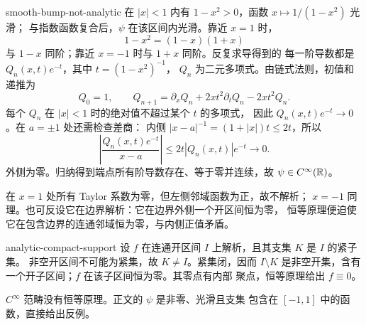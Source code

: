 \begin{solution}{smooth-bump-not-analytic}
在 \(|x|<1\) 内有 \(1-x^2>0\)，函数 \(x\mapsto1/(1-x^2)\) 光滑；
与指数函数复合后，\(\psi\) 在该区间内光滑。靠近 \(x=1\) 时，
\[
 1-x^2=(1-x)(1+x)
\]
与 \(1-x\) 同阶；靠近 \(x=-1\) 时与 \(1+x\) 同阶。反复求导得到的
每一阶导数都是 \(Q_n(x,t)e^{-t}\)，其中 \(t=(1-x^2)^{-1}\)，
\(Q_n\) 为二元多项式。由链式法则，初值和递推为
\[
 Q_0=1,\qquad
 Q_{n+1}=\partial_xQ_n+2xt^2\partial_tQ_n-2xt^2Q_n.
\]
每个 \(Q_n\) 在 \(|x|<1\) 时的绝对值不超过某个 \(t\) 的多项式，
因此 \(Q_n(x,t)e^{-t}\to0\)。在 \(a=\pm1\) 处还需检查差商：
内侧 \(|x-a|^{-1}=(1+|x|)t\le2t\)，所以
\[
 \left|\frac{Q_n(x,t)e^{-t}}{x-a}\right|
 \le2t|Q_n(x,t)|e^{-t}\longrightarrow0.
\]
外侧为零。归纳得到端点所有阶导数存在、等于零并连续，故
\(\psi\in C^\infty(\mathbb{R})\)。

在 \(x=1\) 处所有 Taylor 系数为零，但左侧邻域函数为正，故不解析；
\(x=-1\) 同理。也可反设它在边界解析：它在边界外侧一个开区间恒为零，
恒等原理便迫使它在包含边界的连通邻域恒为零，与内侧正值矛盾。
\end{solution}

\begin{solution}{analytic-compact-support}
设 \(f\) 在连通开区间 \(I\) 上解析，且其支集 \(K\) 是 \(I\) 的紧子集。
非空开区间不可能为紧集，故 \(K\ne I\)。紧集闭，因而 \(I\setminus K\)
是非空开集，含有一个开子区间；\(f\) 在该子区间恒为零。其零点有内部
聚点，恒等原理给出 \(f\equiv0\)。

\(C^\infty\) 范畴没有恒等原理。正文的 \(\psi\) 是非零、光滑且支集
包含在 \([-1,1]\) 中的函数，直接给出反例。
\end{solution}
